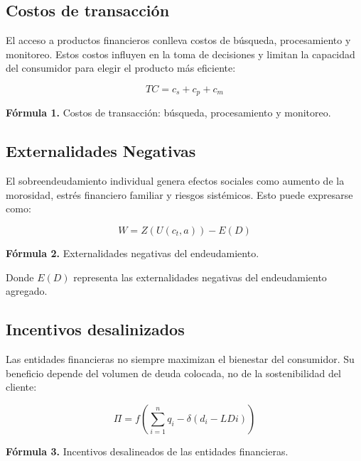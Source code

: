 \documentclass[10pt]{article}
\begin{document}
\begin{multicols}{2}
\subsection{Costos de transacción}

El acceso a productos financieros conlleva costos de búsqueda, procesamiento y monitoreo. Estos costos influyen en la toma de decisiones y limitan la capacidad del consumidor para elegir el producto más eficiente:

\begin{equation}
TC = c_s + c_p + c_m
\end{equation}

\begin{center}
\small\textbf{Fórmula 1.} Costos de transacción: búsqueda, procesamiento y monitoreo.
\end{center}


\subsection{Externalidades Negativas}

El sobreendeudamiento individual genera efectos sociales como aumento de la morosidad, estrés financiero familiar y riesgos sistémicos. Esto puede expresarse como:

\begin{equation}
W = Z(U(c_t, a)) - E(D)
\end{equation}

\begin{center}
\small\textbf{Fórmula 2.} Externalidades negativas del endeudamiento.
\end{center}

Donde $E(D)$ representa las externalidades negativas del endeudamiento agregado.


\subsection{Incentivos desalinizados}

Las entidades financieras no siempre maximizan el bienestar del consumidor. Su beneficio depende del volumen de deuda colocada, no de la sostenibilidad del cliente:

\begin{equation}
\Pi = f\left( \sum_{i=1}^{n} q_i - \delta(d_i - LDi) \right)
\end{equation}

\begin{center}
\small\textbf{Fórmula 3.} Incentivos desalineados de las entidades financieras.
\end{center}


\end{multicols}
\end{document}
